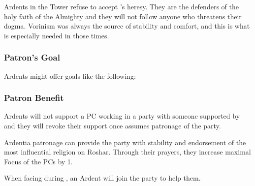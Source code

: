 Ardents in the Tower refuse to accept \npcDalinar{}'s heresy. They are the defenders of the holy faith of the Almighty and they will not follow anyone who threatens their dogma. Vorinism was always the source of stability and comfort, and this is what is especially needed in those times.

\subsubsection{Patron's Goal}

Ardents might offer goals like the following:


\subsubsection{Patron Benefit}

Ardents will not support a PC working in a party with someone supported by \npcDalinar{} and they will revoke their support once \npcDalinar{} assumes patronage of the party.

Ardentia patronage can provide the party with stability and endorsement of the most influential religion on Roshar. Through their prayers, they increase maximal Focus of the PCs by 1.

When facing \npcMidnightMother{} during , an Ardent will join the party to help them.